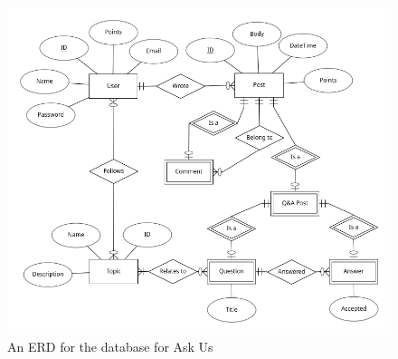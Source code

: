 \begin{figure}[htb]
	\centering
	\includegraphics[width=\linewidth]{../ERD/erd.png}
	\caption{An ERD for the database for Ask Us}
	\label{erd}
\end{figure}
